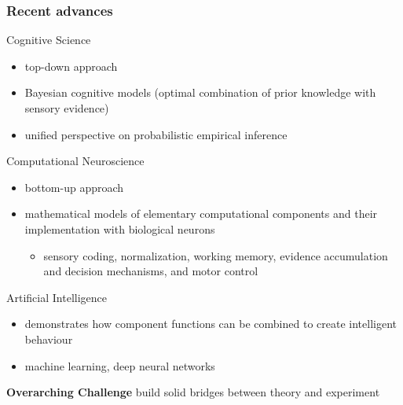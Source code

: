 \documentclass[
t, %
10pt, %
aspectratio=1610, %
ngerman,
english,
]{beamer}
\begin{document}
\begin{frame}
    \frametitle{Recent advances}
    Cognitive Science
    \begin{itemize}
     \item top-down approach
     \item Bayesian cognitive models (optimal combination of prior knowledge with sensory evidence)
     \item unified perspective on probabilistic empirical inference
    \end{itemize}
    Computational Neuroscience
    \begin{itemize}
     \item bottom-up approach
     \item mathematical models of elementary computational components and their implementation with biological neurons
     \begin{itemize}
      \item sensory coding, normalization, working memory, evidence accumulation and decision mechanisms, and motor control
     \end{itemize}

    \end{itemize}
    Artificial Intelligence
    \begin{itemize}
     \item demonstrates how component functions can be combined to create intelligent behaviour
     \item machine learning, deep neural networks
    \end{itemize}
    \vfill
    \textbf{Overarching Challenge}
    build solid bridges between theory and experiment
\end{frame}
\end{document}
